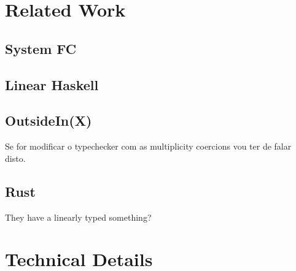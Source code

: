 \documentclass[]{lwnovathesis}
\begin{document}

\chapter{Related Work}

\section{System FC}

\section{Linear Haskell}

\section{OutsideIn(X)}

Se for modificar o typechecker com as multiplicity coercions vou ter de falar
disto.

\section{Rust}

They have a linearly typed something?

\chapter{Technical Details}


\end{document}
